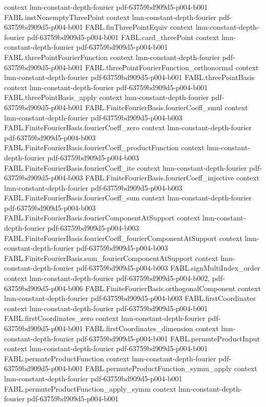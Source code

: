 \begin{theorem}
  {context}
  {lmn-constant-depth-fourier}
  {pdf-63759bd909d5-p004-b001}
\proofstep
  {FABL.instNonemptyThreePoint}
  {context}
  {lmn-constant-depth-fourier}
  {pdf-63759bd909d5-p004-b001}
\proofstep
  {FABL.finThreePointEquiv}
  {context}
  {lmn-constant-depth-fourier}
  {pdf-63759bd909d5-p004-b001}
\proofstep
  {FABL.card_threePoint}
  {context}
  {lmn-constant-depth-fourier}
  {pdf-63759bd909d5-p004-b001}
\proofstep
  {FABL.threePointFourierFunction}
  {context}
  {lmn-constant-depth-fourier}
  {pdf-63759bd909d5-p004-b001}
\proofstep
  {FABL.threePointFourierFunction_orthonormal}
  {context}
  {lmn-constant-depth-fourier}
  {pdf-63759bd909d5-p004-b001}
\proofstep
  {FABL.threePointBasis}
  {context}
  {lmn-constant-depth-fourier}
  {pdf-63759bd909d5-p004-b001}
\proofstep
  {FABL.threePointBasis_apply}
  {context}
  {lmn-constant-depth-fourier}
  {pdf-63759bd909d5-p004-b001}
\proofstep
  {FABL.FiniteFourierBasis.fourierCoeff_smul}
  {context}
  {lmn-constant-depth-fourier}
  {pdf-63759bd909d5-p004-b003}
\proofstep
  {FABL.FiniteFourierBasis.fourierCoeff_zero}
  {context}
  {lmn-constant-depth-fourier}
  {pdf-63759bd909d5-p004-b003}
\proofstep
  {FABL.FiniteFourierBasis.fourierCoeff_productFunction}
  {context}
  {lmn-constant-depth-fourier}
  {pdf-63759bd909d5-p004-b003}
\proofstep
  {FABL.FiniteFourierBasis.fourierCoeff_ite}
  {context}
  {lmn-constant-depth-fourier}
  {pdf-63759bd909d5-p004-b003}
\proofstep
  {FABL.FiniteFourierBasis.fourierCoeff_injective}
  {context}
  {lmn-constant-depth-fourier}
  {pdf-63759bd909d5-p004-b003}
\proofstep
  {FABL.FiniteFourierBasis.fourierCoeff_sum}
  {context}
  {lmn-constant-depth-fourier}
  {pdf-63759bd909d5-p004-b003}
\proofstep
  {FABL.FiniteFourierBasis.fourierComponentAtSupport}
  {context}
  {lmn-constant-depth-fourier}
  {pdf-63759bd909d5-p004-b003}
\proofstep
  {FABL.FiniteFourierBasis.fourierCoeff_fourierComponentAtSupport}
  {context}
  {lmn-constant-depth-fourier}
  {pdf-63759bd909d5-p004-b003}
\proofstep
  {FABL.FiniteFourierBasis.sum_fourierComponentAtSupport}
  {context}
  {lmn-constant-depth-fourier}
  {pdf-63759bd909d5-p004-b003}
\proofstep
  {FABL.signMultiIndex_order}
  {context}
  {lmn-constant-depth-fourier}
  {pdf-63759bd909d5-p004-b002,
    pdf-63759bd909d5-p004-b006}
\proofstep
  {FABL.FiniteFourierBasis.orthogonalComponent}
  {context}
  {lmn-constant-depth-fourier}
  {pdf-63759bd909d5-p004-b003}
\proofstep
  {FABL.firstCoordinates}
  {context}
  {lmn-constant-depth-fourier}
  {pdf-63759bd909d5-p004-b001}
\proofstep
  {FABL.firstCoordinates_zero}
  {context}
  {lmn-constant-depth-fourier}
  {pdf-63759bd909d5-p004-b001}
\proofstep
  {FABL.firstCoordinates_dimension}
  {context}
  {lmn-constant-depth-fourier}
  {pdf-63759bd909d5-p004-b001}
\proofstep
  {FABL.permuteProductInput}
  {context}
  {lmn-constant-depth-fourier}
  {pdf-63759bd909d5-p004-b001}
\proofstep
  {FABL.permuteProductFunction}
  {context}
  {lmn-constant-depth-fourier}
  {pdf-63759bd909d5-p004-b001}
\proofstep
  {FABL.permuteProductFunction_symm_apply}
  {context}
  {lmn-constant-depth-fourier}
  {pdf-63759bd909d5-p004-b001}
\proofstep
  {FABL.permuteProductFunction_apply_symm}
  {context}
  {lmn-constant-depth-fourier}
  {pdf-63759bd909d5-p004-b001}


\end{theorem}
